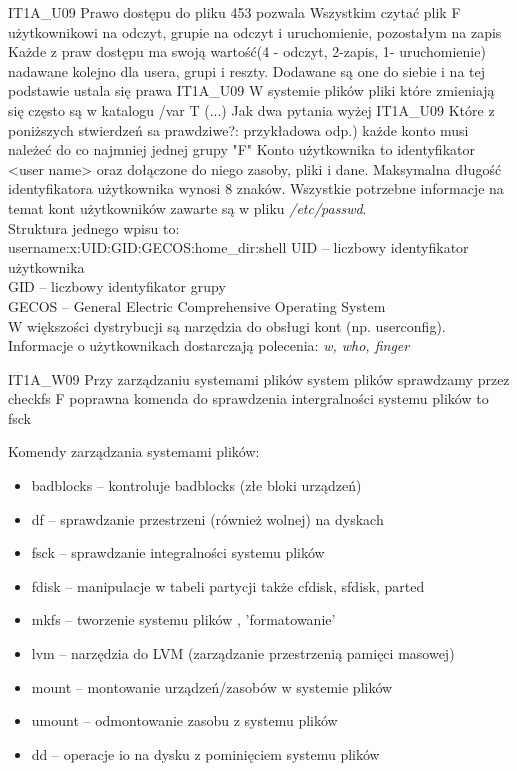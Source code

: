 \answer
{ IT1A\_U09 Prawo dostępu do pliku 453 pozwala}
{Wszystkim czytać plik}
{F}
{użytkownikowi na odczyt, grupie na odczyt i uruchomienie, pozostałym na zapis
}
{Każde z praw dostępu ma swoją wartość(4 - odczyt, 2-zapis, 1- uruchomienie) nadawane kolejno dla usera, grupi i reszty. Dodawane są one do siebie i na tej podstawie ustala się prawa  }
\answer
{IT1A\_U09 W systemie plików}
{pliki które zmieniają się często są w katalogu /var}
{T}
{(...)}
{Jak dwa pytania wyżej}
\answer
{ IT1A\_U09 Które z poniższych stwierdzeń sa prawdziwe?:}
{przykładowa odp.) każde konto musi należeć do co najmniej jednej grupy}
{"F"}
{}
{
Konto użytkownika to identyfikator <user name> oraz dołączone do niego zasoby, pliki i dane. Maksymalna  długość  identyfikatora  użytkownika  wynosi 8 znaków.
Wszystkie potrzebne informacje na temat kont użytkowników zawarte są w pliku \textit{/etc/passwd}.\\
Struktura jednego wpisu to: \\
username:x:UID:GID:GECOS:home\_dir:shell
UID – liczbowy identyfikator użytkownika \\
GID – liczbowy identyfikator grupy \\
GECOS – General Electric Comprehensive Operating System \\ 

W większości dystrybucji są narzędzia do obsługi kont (np. userconfig). Informacje o użytkownikach dostarczają polecenia: \textit{w, who, finger}
}

\answer
{IT1A\_W09 Przy zarządzaniu systemami plików}
{system plików sprawdzamy przez checkfs}
{F}
{poprawna komenda do sprawdzenia intergralności systemu plików to fsck}
{

Komendy zarządzania systemami plików:
\begin{itemize}
\item badblocks – kontroluje badblocks (złe bloki urządzeń)
\item df – sprawdzanie przestrzeni (również wolnej) na dyskach
\item fsck – sprawdzanie integralności systemu plików
\item fdisk – manipulacje w tabeli partycji także cfdisk, sfdisk, parted
\item mkfs – tworzenie systemu plików , 'formatowanie'
\item lvm – narzędzia do LVM (zarządzanie przestrzenią pamięci masowej)
\item mount – montowanie urządzeń/zasobów w systemie plików
\item umount – odmontowanie zasobu z systemu plików
\item dd – operacje io na dysku z pominięciem systemu plików
\end{itemize}
}

